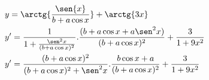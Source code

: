 \begin{ex}
\begin{align}
&y=\arctg{\frac{\sen{x}}{b+a\cos{x}}}+\arctg{3x}\nonumber\\
&y'=\frac{1}{1+\frac{\sen^2{x}}{(b+a\cos{x})^2}}.\frac{(b+a\cos{x}+a\sen^2{x})}{(b+a\cos{x})^2}+\frac{3}{1+9x^2}\nonumber\\
&y'=\frac{(b+a\cos{x})^2}{(b+a\cos{x})^2+\sen^2{x}}.\frac{b\cos{x}+a}{(b+a\cos{x})^2}+\frac{3}{1+9x^2}\nonumber
\end{align}
\end{ex}
